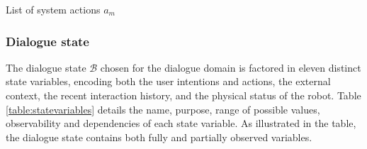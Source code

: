 \begin{table}[p!]
\begin{footnotesize}
\end{footnotesize}
 \caption{List of system actions $a_m$} 
\label{table:systemdas_exp3}
\end{table}

\subsubsection*{Dialogue state}

The dialogue state $\mathcal{B}$ chosen for the dialogue domain is factored in eleven distinct state variables, encoding both the user intentions and actions, the external context, the recent interaction history, and the physical status of the robot. Table \ref{table:statevariables} details the name, purpose, range of possible values, observability and dependencies of each state variable. As illustrated in the table, the dialogue state contains both fully and partially observed variables. 



